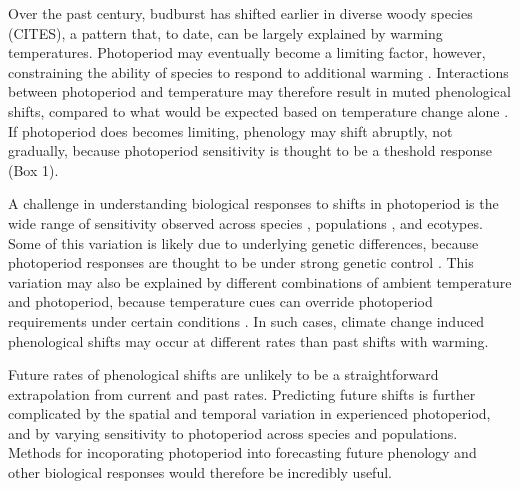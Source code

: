 \documentclass{article}
\begin{document}
\par %
Over the past century, budburst has shifted earlier in diverse woody species (CITES), a pattern that, to date, can be largely explained by warming temperatures. Photoperiod may eventually become a limiting factor, however, constraining the ability of species to respond to additional warming \citep{koerner2010b,vitasse2013, Morin:2010aa,Nienstaedt:1966aa}. Interactions between photoperiod and temperature may therefore result in muted phenological shifts, compared to what would be expected based on temperature change alone \citep{wareing1956,mimura2007,koerner2010b}. If photoperiod does becomes limiting, phenology may shift abruptly, not gradually, because photoperiod sensitivity is thought to be a theshold response (Box 1). 
\par A challenge in understanding biological responses to shifts in photoperiod is the wide range of sensitivity observed across species \citep{Sanz-Perez:2009aa, zohner2016,flynn2018}, populations \citep{tanino2010}, and ecotypes\citep{Howe:1995aa}. Some of this variation is likely due to underlying genetic differences, because photoperiod responses are thought to be under strong genetic control \cite{bradshaw1995,weih2004,keller2011}. This variation may also be explained by different combinations of ambient temperature and photoperiod, because temperature cues can override photoperiod requirements under certain conditions \citep [e.g., during growth cessation][] {tanino2010}. In such cases, climate change induced phenological shifts may occur at different rates than past shifts with warming. 
\par Future rates of phenological shifts are unlikely to be a straightforward extrapolation from current and past rates. Predicting future shifts is further complicated by the spatial and temporal variation in experienced photoperiod, and by varying sensitivity to photoperiod across species and populations.  Methods for incoporating photoperiod into forecasting future phenology and other biological responses would therefore be incredibly useful.
\end{document}
